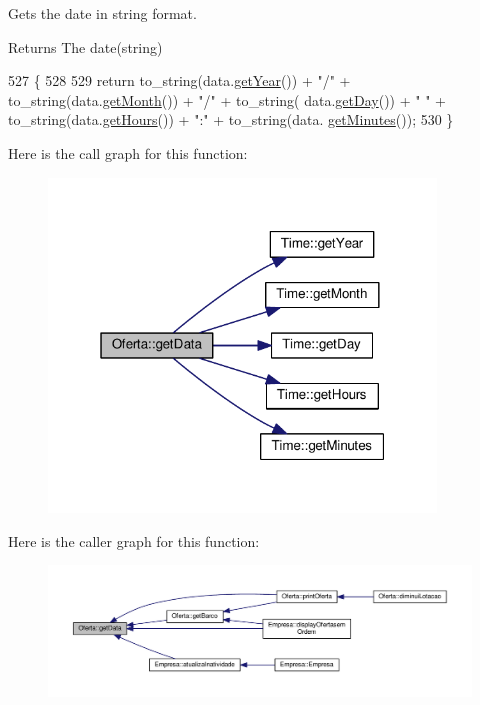 Gets the date in string format. 

\begin{DoxyReturn}{Returns}
The date(string) 
\end{DoxyReturn}

\begin{DoxyCode}
527                        \{
528 
529     \textcolor{keywordflow}{return} to\_string(data.\hyperlink{classTime_ade4d01d38041bb86a2e1ded9fd3cd28e}{getYear}()) + \textcolor{stringliteral}{"/"} + to\_string(data.\hyperlink{classTime_a22fd86b14d3b067cf1447fd9ca5caf6f}{getMonth}()) + \textcolor{stringliteral}{"/"} + to\_string(
      data.\hyperlink{classTime_abdccc37217b520155a67a1d732014f1a}{getDay}()) + \textcolor{stringliteral}{" "} + to\_string(data.\hyperlink{classTime_ac38ba7bbc9876d7d75c6fb16ba7ac453}{getHours}()) + \textcolor{stringliteral}{":"} + to\_string(data.
      \hyperlink{classTime_a800d91da444cd295a329925c45942359}{getMinutes}());
530 \}
\end{DoxyCode}


Here is the call graph for this function\+:\nopagebreak
\begin{figure}[H]
\begin{center}
\leavevmode
\includegraphics[width=292pt]{classOferta_a2b156b75371ad59af54ad96ad79c9d1e_cgraph}
\end{center}
\end{figure}




Here is the caller graph for this function\+:
\nopagebreak
\begin{figure}[H]
\begin{center}
\leavevmode
\includegraphics[width=350pt]{classOferta_a2b156b75371ad59af54ad96ad79c9d1e_icgraph}
\end{center}
\end{figure}


